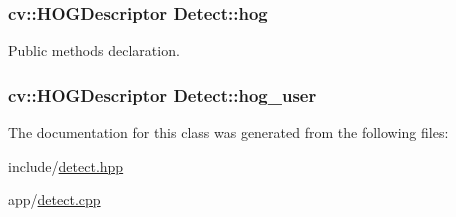 \subsubsection[{\texorpdfstring{hog}{hog}}]{\setlength{\rightskip}{0pt plus 5cm}cv\+::\+H\+O\+G\+Descriptor Detect\+::hog}\hypertarget{classDetect_ab7b1c5cfa3e8f5daa91f2fe644327005}{}\label{classDetect_ab7b1c5cfa3e8f5daa91f2fe644327005}


Public methods declaration. 

\subsubsection[{\texorpdfstring{hog\+\_\+user}{hog_user}}]{\setlength{\rightskip}{0pt plus 5cm}cv\+::\+H\+O\+G\+Descriptor Detect\+::hog\+\_\+user}\hypertarget{classDetect_ad7d55a57eca5ee84b37c1ea00489f770}{}\label{classDetect_ad7d55a57eca5ee84b37c1ea00489f770}


The documentation for this class was generated from the following files\+:\begin{DoxyCompactItemize}
\item 
include/\hyperlink{detect_8hpp}{detect.\+hpp}\item 
app/\hyperlink{detect_8cpp}{detect.\+cpp}\end{DoxyCompactItemize}
